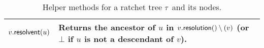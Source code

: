 \begin{table*}[!t]
\begin{minipage}{\textwidth}
\begin{tabularx}{.48\textwidth}{| l | X |}
  		\hline
  		$v.{\mathsf{resolvent}}(u)$ & Returns the ancestor of $u$ in $v.{\mathsf{resolution}}() \setminus (v)$ (or $\bot$ if $u$ is not a descendant of $v$).\\
  		\hline
  	\end{tabularx}
	  \caption{Helper methods for a ratchet tree $\tau$ and its nodes.\vspace{-1em}}
	  \label{tab:node_helpers}
  \end{minipage}
\end{table*}

